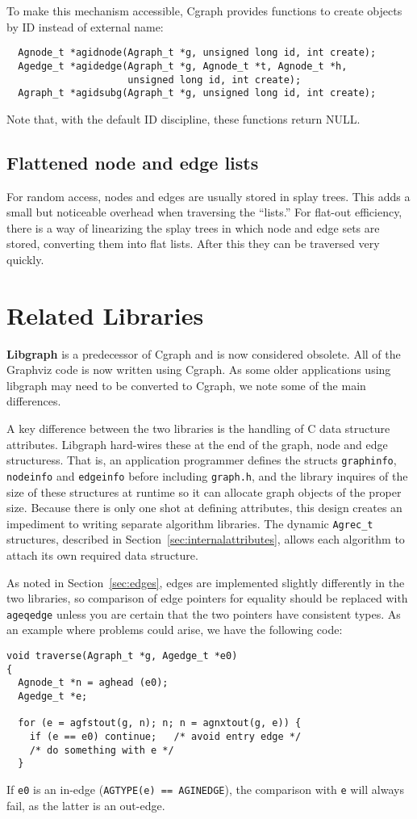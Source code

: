 \documentclass[11pt,letterpaper]{article}
\begin{document}
To make this mechanism accessible, Cgraph provides functions
to create objects by ID instead of external name:
\begin{verbatim}
  Agnode_t *agidnode(Agraph_t *g, unsigned long id, int create);
  Agedge_t *agidedge(Agraph_t *g, Agnode_t *t, Agnode_t *h, 
                     unsigned long id, int create);
  Agraph_t *agidsubg(Agraph_t *g, unsigned long id, int create);
\end{verbatim}
Note that, with the default ID discipline, these functions return NULL.

\subsection{Flattened node and edge lists}
For random access, nodes and edges are usually stored in splay trees. 
This adds a small but noticeable overhead when traversing the ``lists.''
For flat-out efficiency,
there is a way of linearizing the splay trees in which node
and edge sets are stored, converting them into flat lists.  After
this they can be traversed very quickly.

\section{Related Libraries}
\label{sec:relatedlibraries}
{\bf Libgraph} is a predecessor of Cgraph and is now considered
obsolete. All of the Graphviz code is now written using Cgraph.
As some older applications using libgraph
may need to be converted to Cgraph, we note some of the main
differences.

A key difference between the two libraries is the handling of
C data structure attributes.  Libgraph hard-wires these
at the end of the graph, node and edge structuress.  That is,
an application programmer defines the structs {\tt graphinfo}, {\tt nodeinfo}
and {\tt edgeinfo} before including {\tt graph.h}, and the library inquires of
the size of these structures at runtime so it can allocate graph
objects of the proper size.  Because there is only one shot at
defining attributes, this design creates an impediment to writing
separate algorithm libraries.
The dynamic \verb"Agrec_t" structures, described in Section~\ref{sec:internalattributes}, 
allows each algorithm to attach its own required data structure.

As noted in Section~\ref{sec:edges}, edges are implemented slightly
differently in the two libraries, so comparison of edge pointers for
equality should be replaced with \verb"ageqedge" unless you are certain
that the two pointers have consistent types. As an example where problems
could arise, we have the following code:
\begin{verbatim}
void traverse(Agraph_t *g, Agedge_t *e0)
{
  Agnode_t *n = aghead (e0);
  Agedge_t *e;
    
  for (e = agfstout(g, n); n; n = agnxtout(g, e)) {
    if (e == e0) continue;   /* avoid entry edge */
    /* do something with e */
  }
\end{verbatim}
If \verb"e0" is an in-edge (\verb"AGTYPE(e) == AGINEDGE"), the comparison
with \verb"e" will always fail, as the latter is an out-edge.
\end{document}
